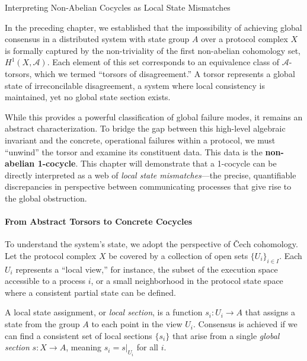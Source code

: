 \documentclass[
]{article}
\begin{document}
\protect{}\label{chapter-4-2-Interpreting_Non-Abelian_Cocycles_as_Loc}{}

Interpreting Non-Abelian Cocycles as Local State Mismatches

In the preceding chapter, we established that the impossibility of
achieving global consensus in a distributed system with state group
\(A\) over a protocol complex \(X\) is formally captured by the
non-triviality of the first non-abelian cohomology set,
\(H^1(X, \mathcal{A})\). Each element of this set corresponds to an
equivalence class of \(\mathcal{A}\)-torsors, which we termed ``torsors
of disagreement.'' A torsor represents a global state of irreconcilable
disagreement, a system where local consistency is maintained, yet no
global state section exists.

While this provides a powerful classification of global failure modes,
it remains an abstract characterization. To bridge the gap between this
high-level algebraic invariant and the concrete, operational failures
within a protocol, we must ``unwind'' the torsor and examine its
constituent data. This data is the \textbf{non-abelian 1-cocycle}. This
chapter will demonstrate that a 1-cocycle can be directly interpreted as
a web of \emph{local state mismatches}---the precise, quantifiable
discrepancies in perspective between communicating processes that give
rise to the global obstruction.

\paragraph{From Abstract Torsors to Concrete
Cocycles}\label{from-abstract-torsors-to-concrete-cocycles}

To understand the system's state, we adopt the perspective of Čech
cohomology. Let the protocol complex \(X\) be covered by a collection of
open sets \(\{U_i\}_{i \in I}\). Each \(U_i\) represents a ``local
view,'' for instance, the subset of the execution space accessible to a
process \(i\), or a small neighborhood in the protocol state space where
a consistent partial state can be defined.

A local state assignment, or \emph{local section}, is a function
\(s_i: U_i \to A\) that assigns a state from the group \(A\) to each
point in the view \(U_i\). Consensus is achieved if we can find a
consistent set of local sections \(\{s_i\}\) that arise from a single
\emph{global section} \(s: X \to A\), meaning \(s_i = s|_{U_i}\) for all
\(i\).
\end{document}
